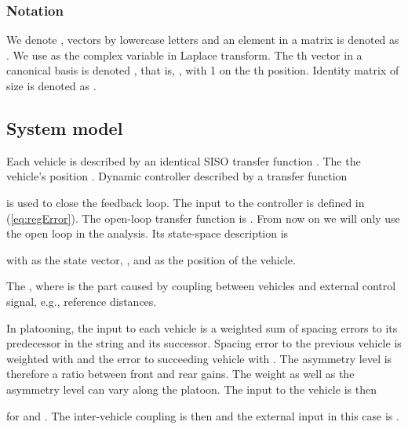 \documentclass[technote, 10pt, twoside]{IEEEtran}
\theoremstyle{plain}
\theoremstyle{definition}
\theoremstyle{assump}
\begin{document}
\subsubsection*{Notation}
We denote , vectors by lowercase letters and an
element in a matrix  is denoted as . We use  as the complex
variable in Laplace transform. The th vector in a canonical basis is
denoted , that is, , with 1 on the th position. Identity matrix of size
 is denoted as .

\subsection{System model}
Each vehicle is described by an identical SISO transfer function
. The
 the vehicle's
position . Dynamic controller described by a transfer function

is used to close the feedback loop. The input to the controller is defined in
(\ref{eq:regError}). The open-loop transfer function is
. From now on we
will only use the open loop in the analysis. Its state-space description is

with  as the state vector,
, and  as the position of the vehicle.

The  , where
 is the part caused by coupling between vehicles and 
external control signal, e.g., reference distances. 


In platooning, the input  to each vehicle is a weighted sum of
spacing errors to its predecessor in the string and its successor. Spacing error
to the previous vehicle is weighted with  and the error to
succeeding vehicle with . The asymmetry level
 is therefore a ratio between front and rear gains. The
weight  as well as the asymmetry level  can vary
along the platoon. The input to the vehicle is then

for  and . The inter-vehicle coupling
is then  and the external input in this case is
. 
	
\end{document}
